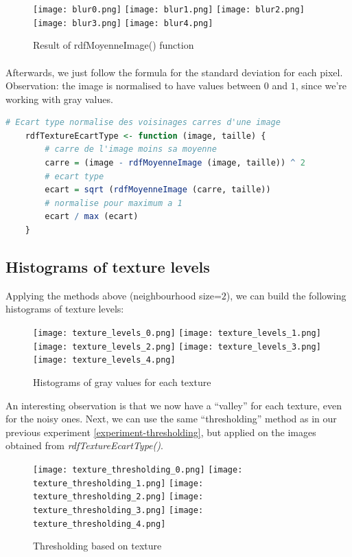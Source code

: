 \begin{figure}[h]
    \centering
    \texttt{[image: blur0.png]}
    \texttt{[image: blur1.png]}
    \texttt{[image: blur2.png]}
    \texttt{[image: blur3.png]}
    \texttt{[image: blur4.png]}
    \caption{Result of rdfMoyenneImage() function}
    \label{fig-blur-images}
\end{figure}

\clearpage

\paragraph{}
Afterwards, we just follow the formula for the standard deviation for each pixel.
Observation: the image is normalised to have values between $0$ and $1$, since we're working with gray values.

\begin{lstlisting}[language=R, caption=Calculating a pixel's average value]
    # Ecart type normalise des voisinages carres d'une image
    rdfTextureEcartType <- function (image, taille) {
        # carre de l'image moins sa moyenne
        carre = (image - rdfMoyenneImage (image, taille)) ^ 2
        # ecart type
        ecart = sqrt (rdfMoyenneImage (carre, taille))
        # normalise pour maximum a 1
        ecart / max (ecart)
    }
\end{lstlisting}

\subsection{Histograms of texture levels}
Applying the methods above (neighbourhood size=$2$), we can build the following histograms of texture levels:
\begin{figure}[h]
    \centering
    \texttt{[image: texture\_levels\_0.png]}
    \texttt{[image: texture\_levels\_1.png]}
    \texttt{[image: texture\_levels\_2.png]}
    \texttt{[image: texture\_levels\_3.png]}
    \texttt{[image: texture\_levels\_4.png]}
    \caption{Histograms of gray values for each texture}
    \label{}
\end{figure}

\clearpage

An interesting observation is that we now have a ``valley'' for each texture, even for the noisy ones.
Next, we can use the same ``thresholding'' method as in our previous experiment \ref{experiment-thresholding}, but applied on the images obtained from \emph{rdfTextureEcartType()}.
\begin{figure}[h]
    \centering
    \texttt{[image: texture\_thresholding\_0.png]}
    \texttt{[image: texture\_thresholding\_1.png]}
    \texttt{[image: texture\_thresholding\_2.png]}
    \texttt{[image: texture\_thresholding\_3.png]}
    \texttt{[image: texture\_thresholding\_4.png]}
    \caption{Thresholding based on texture}
\end{figure}

